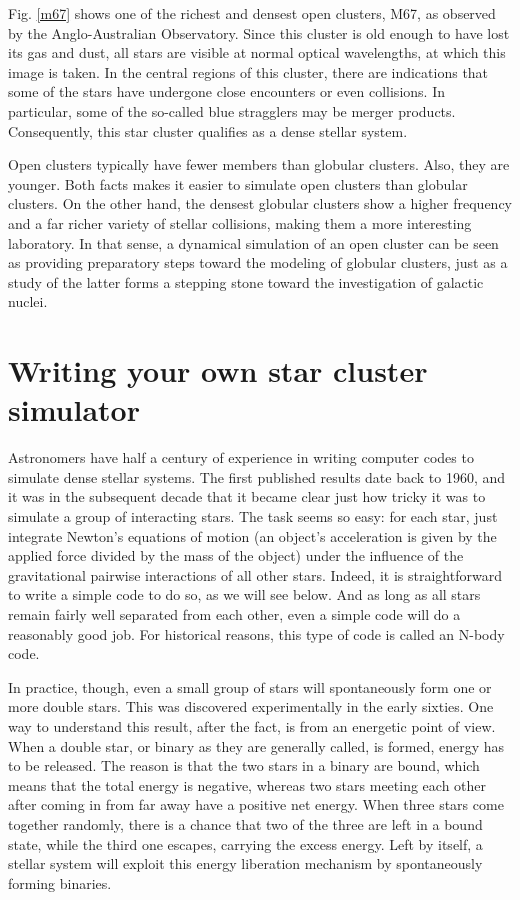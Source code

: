 \documentclass{book}
\begin{document}
Fig. \ref{m67} shows one of the richest and densest open clusters, M67,
as observed by the Anglo-Australian Observatory.  Since this cluster
is old enough to have lost its gas and dust, all stars are visible at
normal optical wavelengths, at which this image is taken.  In the
central regions of this cluster, there are indications that some of
the stars have undergone close encounters or even collisions.  In
particular, some of the so-called blue stragglers may be merger
products.  Consequently, this star cluster qualifies as a dense
stellar system.

Open clusters typically have fewer members than globular clusters.
Also, they are younger.  Both facts makes it easier to simulate open
clusters than globular clusters.  On the other hand, the densest
globular clusters show a higher frequency and a far richer variety of
stellar collisions, making them a more interesting laboratory.  In
that sense, a dynamical simulation of an open cluster can be seen as
providing preparatory steps toward the modeling of globular clusters,
just as a study of the latter forms a stepping stone toward the
investigation of galactic nuclei.

\section{  Writing your own star cluster simulator}
\label{sect:10}

Astronomers have half a century of experience in writing computer
codes to simulate dense stellar systems.  The first published results
date back to 1960, and it was in the subsequent decade that it became
clear just how tricky it was to simulate a group of interacting stars.
The task seems so easy: for each star, just integrate Newton's
equations of motion (an object's acceleration is given by the applied
force divided by the mass of the object) under the influence of the
gravitational pairwise interactions of all other stars.  Indeed, it is
straightforward to write a simple code to do so, as we will see below.
And as long as all stars remain fairly well separated from each other,
even a simple code will do a reasonably good job.  For historical
reasons, this type of code is called an N-body code.

In practice, though, even a small group of stars will spontaneously
form one or more double stars.  This was discovered experimentally in
the early sixties.  One way to understand this result, after the fact,
is from an energetic point of view.  When a double star, or binary as
they are generally called, is formed, energy has to be released.  The
reason is that the two stars in a binary are bound, which means that
the total energy is negative, whereas two stars meeting each other
after coming in from far away have a positive net energy.  When
three stars come together randomly, there is a chance that two of the
three are left in a bound state, while the third one escapes, carrying
the excess energy.  Left by itself, a stellar system will exploit this
energy liberation mechanism by spontaneously forming binaries.
\end{document}
